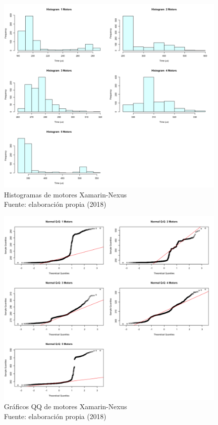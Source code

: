 \begin{figure}
 \begin{center} 
   	\includegraphics[width=1.0\textwidth]{evaluation/graphics/Xamarin/Nexus/HistMotorsXamarinNexus.png} 
    \caption[Histogramas de motores Xamarin-Nexus]{Histogramas de motores  Xamarin-Nexus\\Fuente: elaboración propia (2018)} 
    \label{fig:xamarin-nexus-hist-motors}
  \end{center}
\end{figure}

\begin{figure}[H]
  \begin{center} 
   	\includegraphics[width=1.0\textwidth]{evaluation/graphics/Xamarin/Nexus/NormalQQMotorsXamarinNexus.png} 
    \caption[Gráfico QQ de motores Xamarin-Nexus]{Gráficos QQ de motores Xamarin-Nexus\\Fuente: elaboración propia (2018)} 
    \label{fig:xamarin-nexus-QQ-motors}
  \end{center}
\end{figure}

